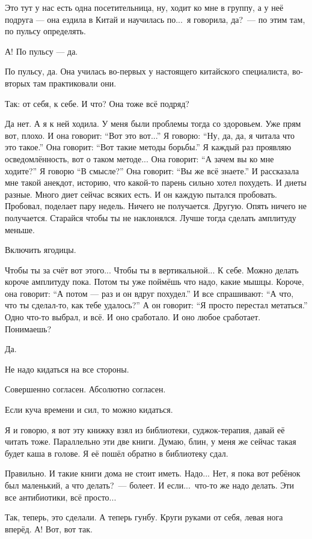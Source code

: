 \M
Это тут у нас есть
одна посетительница, ну, ходит ко мне в группу, а у неё подруга ---
она ездила в Китай и научилась по...\
я говорила, да?\ --- по этим там, по пульсу определять.

\I
А! По пульсу --- да.

\M
По пульсу, да.
Она училась во-первых у настоящего китайского специалиста, во-вторых там практиковали они.

\I
Так: от себя, к себе.
И что? Она тоже всё подряд?

\M
Да нет. А я к ней ходила. У меня
были проблемы тогда со здоровьем. Уже прям вот, плохо.
И она говорит: ``Вот это вот...'' Я говорю: ``Ну, да, да, я читала что это такое.''
Она говорит: ``Вот такие методы борьбы.''
Я каждый раз проявляю осведомлённость, вот о таком методе...
Она говорит: ``А зачем вы ко мне ходите?''
Я говорю ``В смысле?''
Она говорит: ``Вы же всё знаете.''
И рассказала мне такой анекдот, историю, что какой-то парень сильно хотел похудеть.
И диеты разные.
Много диет сейчас всяких есть.
И он каждую пытался пробовать. Пробовал, поделает пару недель.
Ничего не получается.
Другую. Опять ничего не получается.
Старайся чтобы ты не наклонялся.
Лучше тогда сделать амплитуду меньше.

\I
Включить ягодицы.

\M
Чтобы ты за счёт вот
этого...
Чтобы ты в вертикальной...
К себе.
Можно делать короче амплитуду пока.
Потом ты уже поймёшь что надо,
какие мышцы.
Короче, она говорит: ``А потом --- {\csc раз} и он вдруг похудел.''
И все спрашивают: ``А что, что ты сделал-то, как тебе удалось?''
А он говорит: ``Я просто перестал метаться.'' Одно что-то
выбрал, и всё. И оно сработало. И оно любое сработает. Понимаешь?

\I
Да.

\M
Не надо кидаться на все стороны.

\I
Совершенно согласен. Абсолютно согласен.

\M
Если куча времени и сил,
то можно кидаться.

\I
Я и говорю, я вот эту книжку взял из библиотеки, суджок-терапия, давай её читать
тоже. Параллельно эти две книги. Думаю, блин, у меня же
сейчас такая будет каша в голове. Я её пошёл обратно в библиотеку сдал.

\M
Правильно.
И такие книги дома не стоит иметь. Надо... Нет,
я пока вот ребёнок был маленький, а что делать?\ --- болеет.
И если...\ что-то же надо делать.
Эти все антибиотики, всё просто...

\I
Так, теперь, это сделали. А теперь гунбу. Круги
руками от себя, левая нога вперёд. А! Вот, вот так.

